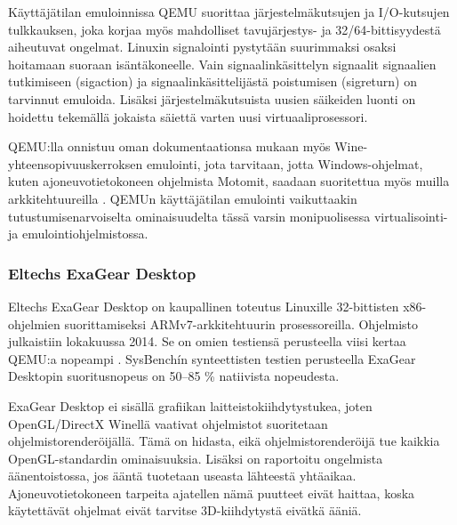 Käyttäjätilan emuloinnissa QEMU suorittaa järjestelmäkutsujen ja I/O-kutsujen tulkkauksen, joka korjaa myös mahdolliset tavujärjestys- ja 32/64-bittisyydestä aiheutuvat ongelmat. Linuxin signalointi pystytään suurimmaksi osaksi hoitamaan suoraan isäntäkoneelle. Vain signaalinkäsittelyn signaalit signaalien tutkimiseen (sigaction) ja signaalinkäsittelijästä poistumisen (sigreturn) on tarvinnut emuloida. Lisäksi järjestelmäkutsuista uusien säikeiden luonti on hoidettu tekemällä jokaista säiettä varten uusi virtuaaliprosessori. \citep{qemu_tech}

QEMU:lla onnistuu oman dokumentaationsa mukaan myös Wine-yhteensopivuuskerroksen emulointi, jota tarvitaan, jotta Windows-ohjelmat, kuten ajoneuvotietokoneen ohjelmista Motomit, saadaan suoritettua myös muilla arkkitehtuureilla \cite{qemu_use}. QEMUn käyttäjätilan emulointi vaikuttaakin tutustumisenarvoiselta ominaisuudelta tässä varsin monipuolisessa virtualisointi- ja emulointiohjelmistossa.


\subsubsection{Eltechs ExaGear Desktop}
Eltechs ExaGear Desktop on kaupallinen toteutus Linuxille 32-bittisten x86-ohjelmien suorittamiseksi ARMv7-arkkitehtuurin prosessoreilla. Ohjelmisto julkaistiin lokakuussa 2014. Se on omien testiensä perusteella viisi kertaa QEMU:a nopeampi \cite{eltechs:exagear}. SysBenchín synteettisten testien perusteella ExaGear Desktopin suoritusnopeus on 50--85 \% natiivista nopeudesta.

ExaGear Desktop ei sisällä grafiikan laitteistokiihdytystukea, joten OpenGL/DirectX Winellä vaativat ohjelmistot suoritetaan ohjelmistorenderöijällä. Tämä on hidasta, eikä ohjelmistorenderöijä tue kaikkia OpenGL-standardin ominaisuuksia. Lisäksi on raportoitu ongelmista äänentoistossa, jos ääntä tuotetaan useasta lähteestä yhtäaikaa. Ajoneuvotietokoneen tarpeita ajatellen nämä puutteet eivät haittaa, koska käytettävät ohjelmat eivät tarvitse 3D-kiihdytystä eivätkä ääniä. \citep{eltechs:odroid}

